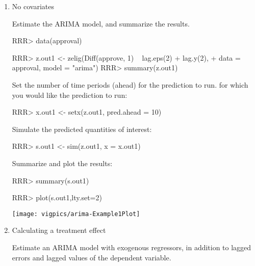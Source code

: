 \begin{enumerate}

\item No covariates\newline

Estimate the ARIMA model, and summarize the results.
\begin{Schunk}
\begin{Sinput}
RRR>  data(approval)
\end{Sinput}
\end{Schunk}
\begin{Schunk}
\begin{Sinput}
RRR> z.out1 <- zelig(Diff(approve, 1) ~ lag.eps(2) + lag.y(2), 
+               data = approval, model = "arima")
RRR> summary(z.out1)
\end{Sinput}
\end{Schunk}
Set the number of time periods (ahead) for the prediction to run.
for which you would like the prediction to run:
\begin{Schunk}
\begin{Sinput}
RRR> x.out1 <- setx(z.out1, pred.ahead = 10)
\end{Sinput}
\end{Schunk}
Simulate the predicted quantities of interest:
\begin{Schunk}
\begin{Sinput}
RRR> s.out1 <- sim(z.out1, x = x.out1)
\end{Sinput}
\end{Schunk}
Summarize and plot the results:
\begin{Schunk}
\begin{Sinput}
RRR> summary(s.out1)
\end{Sinput}
\end{Schunk}
\begin{center}
\begin{Schunk}
\begin{Sinput}
RRR>  plot(s.out1,lty.set=2)
\end{Sinput}
\end{Schunk}
\texttt{[image: vigpics/arima-Example1Plot]}
\end{center}

\item Calculating a treatment effect\newline

Estimate an ARIMA model with exogenous regressors, in addition to
lagged errors and lagged values of the dependent variable.


\end{enumerate}
